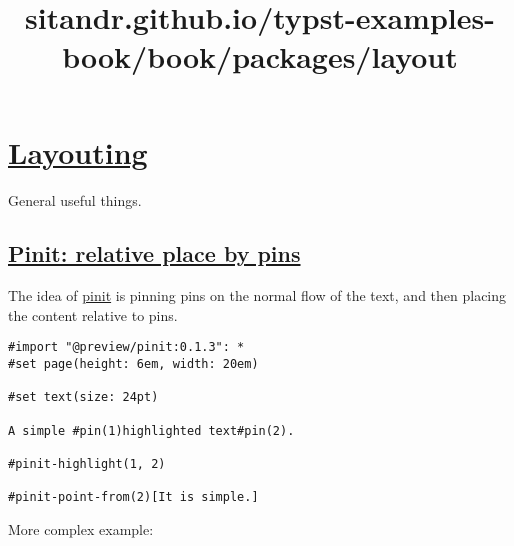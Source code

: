 \pandocbounded{}

\pandocbounded{}

\pandocbounded{}

\pandocbounded{}


\title{sitandr.github.io/typst-examples-book/book/packages/layout}

\section{\texorpdfstring{\hyperref[layouting]{Layouting}}{Layouting}}\label{layouting}

General useful things.

\subsection{\texorpdfstring{\hyperref[pinit-relative-place-by-pins]{Pinit:
relative place by
pins}}{Pinit: relative place by pins}}\label{pinit-relative-place-by-pins}

The idea of \href{https://github.com/OrangeX4/typst-pinit}{pinit} is
pinning pins on the normal flow of the text, and then placing the
content relative to pins.

\begin{verbatim}
#import "@preview/pinit:0.1.3": *
#set page(height: 6em, width: 20em)

#set text(size: 24pt)

A simple #pin(1)highlighted text#pin(2).

#pinit-highlight(1, 2)

#pinit-point-from(2)[It is simple.]
\end{verbatim}

\pandocbounded{}

More complex example:

